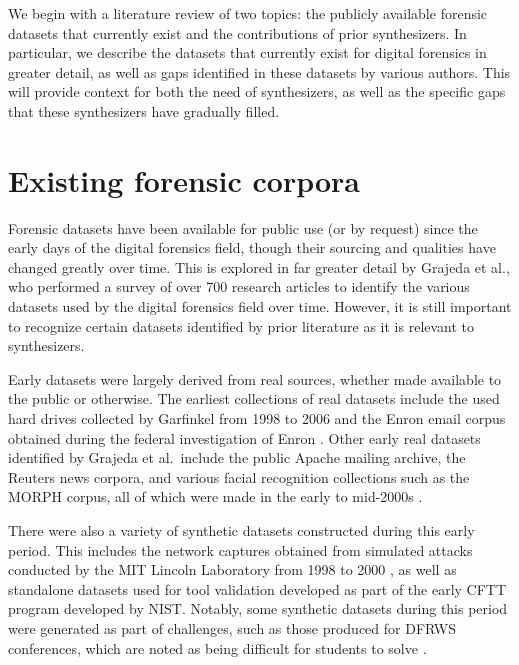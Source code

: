 We begin with a literature review of two topics: the publicly available
forensic datasets that currently exist and the contributions of prior
synthesizers. In particular, we describe the datasets that currently
exist for digital forensics in greater detail, as well as gaps
identified in these datasets by various authors. This will provide
context for both the need of synthesizers, as well as the specific gaps
that these synthesizers have gradually filled.

\section{Existing forensic
corpora}\label{existing-forensic-corpora}

Forensic datasets have been available for public use (or by request)
since the early days of the digital forensics field, though their
sourcing and qualities have changed greatly over time. This is explored
in far greater detail by Grajeda et al., who performed a survey of over
700 research articles to identify the various datasets used by the
digital forensics field over time. However, it is still important to
recognize certain datasets identified by prior literature as it is
relevant to synthesizers.

Early datasets were largely derived from real sources, whether made
available to the public or otherwise. The earliest collections of real
datasets include the used hard drives collected by Garfinkel from 1998
to 2006 and the Enron email corpus obtained during the federal
investigation of Enron \cite{garfinkelForensicCorporaChallenge2007}.
Other early real datasets identified by Grajeda et al.~include the
public Apache mailing archive, the Reuters news corpora, and various
facial recognition collections such as the MORPH corpus, all of which
were made in the early to mid-2000s
\cite{yannikosDataCorporaDigital2014,grajedaAvailabilityDatasetsDigital2017}.

There were also a variety of synthetic datasets constructed during this
early period. This includes the network captures obtained from simulated
attacks conducted by the MIT Lincoln Laboratory from 1998 to 2000
\cite{garfinkelForensicCorporaChallenge2007}, as well as standalone
datasets used for tool validation developed as part of the early CFTT
program developed by NIST. Notably, some synthetic datasets during this
period were generated as part of challenges, such as those produced for
DFRWS conferences, which are noted as being difficult for students to
solve \cite{woodsCreatingRealisticCorpora2011}.

